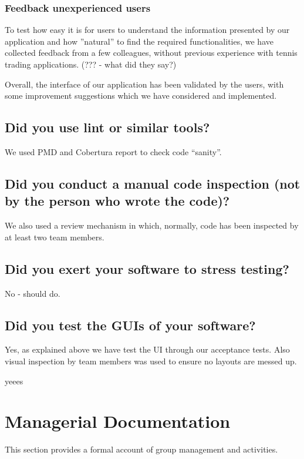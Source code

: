 \documentclass[10pt]{article}
\begin{document}
\subsubsection{Feedback unexperienced users}

To test how easy it is for users to understand the information presented by our application and how ''natural'' to find the required functionalities, we have collected feedback from a few colleagues, without previous experience with tennis trading applications. (??? - what did they say?)

Overall, the interface of our application has been validated by the users, with some improvement suggestions which we have considered and implemented.


\subsection{Did you use lint or similar tools?}

We used PMD and Cobertura report to check code ``sanity''.

\subsection{Did you conduct a manual code inspection (not by the person who wrote the code)?}

We also used a review mechanism in which, normally, code has been inspected by at least two team members.

\subsection{Did you exert your software to stress testing?}

No - should do.

\subsection{Did you test the GUIs of your software?}
Yes, as explained above we have test the UI through our acceptance tests. Also visual inspection by team members was used to ensure no layouts are messed up.

yeees

\section{Managerial Documentation}

This section provides a formal account of group management and activities.
\end{document}
